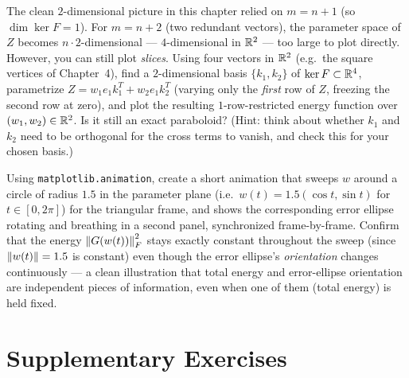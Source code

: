 \begin{exercisebox}[title={Lab Exercise 6.3: A Larger Parameter Space}]
The clean $2$-dimensional picture in this chapter relied on $m=n+1$
(so $\dim\ker F=1$). For $m=n+2$ (two redundant vectors), the parameter
space of $Z$ becomes $n\cdot 2$-dimensional --- $4$-dimensional in
$\mathbb{R}^2$ --- too large to plot directly. However, you can still plot
\emph{slices}. Using four vectors in $\mathbb{R}^2$ (e.g.\ the square vertices
of Chapter~4), find a $2$-dimensional basis $\{k_1,k_2\}$ of
$\ker F\subset\mathbb{R}^4$, parametrize $Z=w_1e_1k_1^T+w_2e_1k_2^T$ (varying
only the \emph{first} row of $Z$, freezing the second row at zero), and
plot the resulting $1$-row-restricted energy function over
$(w_1,w_2)\in\mathbb{R}^2$. Is it still an exact paraboloid? (Hint: think about
whether $k_1$ and $k_2$ need to be orthogonal for the cross terms to
vanish, and check this for your chosen basis.)
\end{exercisebox}

\begin{exercisebox}[title={Lab Exercise 6.4 (Optional, Challenge): Animating the Family}]
Using \texttt{matplotlib.animation}, create a short animation that
sweeps $w$ around a circle of radius $1.5$ in the parameter plane (i.e.\
$w(t)=1.5(\cos t,\sin t)$ for $t\in[0,2\pi]$) for the triangular frame,
and shows the corresponding error ellipse rotating and breathing in a
second panel, synchronized frame-by-frame. Confirm that the energy
$\left\| G(w(t)) \right\|_F^2$ stays exactly constant throughout the sweep (since
$\left\| w(t) \right\|=1.5$ is constant) even though the error ellipse's
\emph{orientation} changes continuously --- a clean illustration that
total energy and error-ellipse orientation are independent pieces of
information, even when one of them (total energy) is held fixed.
\end{exercisebox}
\newpage
\section{Supplementary Exercises}
\label{sec:extra-ch6}


